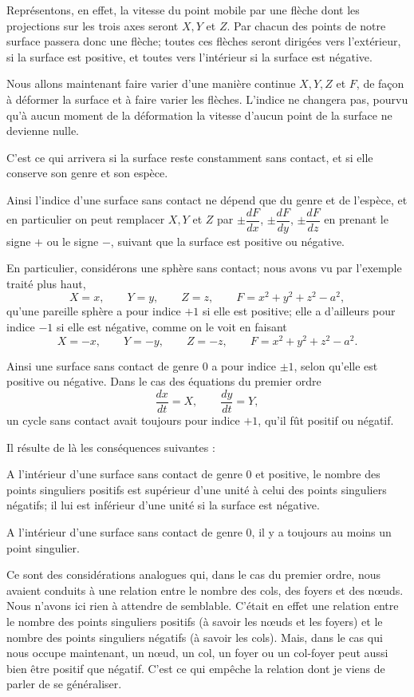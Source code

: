 \documentclass[11pt]{article}
\begin{document}
Représentons, en effet, la vitesse du point mobile par une flèche dont les projections sur les trois axes seront $X,Y$ et $Z$. Par chacun des points de notre surface passera donc une flèche; toutes ces flèches seront dirigées vers l’extérieur, si la surface est positive, et toutes vers l’intérieur si la surface est négative.

Nous allons maintenant faire varier d’une manière continue $X,Y,Z$ et $F$, de façon à déformer la surface et à faire varier les flèches. L’indice ne changera pas, pourvu qu’à aucun moment de la déformation la vitesse d’aucun point de la surface ne devienne nulle.

C’est ce qui arrivera si la surface reste constamment sans contact, et si elle conserve son genre et son espèce.

Ainsi l’indice d’une surface sans contact ne dépend que du genre et de l’espèce, et en particulier on peut remplacer $X,Y$ et $Z$ par $\pm\dfrac{dF}{dx}$, $\pm\dfrac{dF}{dy}$, $\pm\dfrac{dF}{dz}$ en prenant le signe $+$ ou le signe $-$, suivant que la surface est positive ou négative.

En particulier, considérons une sphère sans contact; nous avons vu par l’exemple traité plus haut,
\[
X=x,\qquad Y=y,\qquad Z=z,
\qquad F=x^2+y^2+z^2-a^2,
\]
qu’une pareille sphère a pour indice $+1$ si elle est positive; elle a d’ailleurs pour indice $-1$ si elle est négative, comme on le voit en faisant
\[
X=-x,
\qquad Y=-y,
\qquad Z=-z,
\qquad F=x^2+y^2+z^2-a^2.
\]

Ainsi une surface sans contact de genre 0 a pour indice $\pm1$, selon qu’elle est positive ou négative. Dans le cas des équations du premier ordre
\[
\frac{dx}{dt}=X,
\qquad \frac{dy}{dt}=Y,
\]
un cycle sans contact avait toujours pour indice $+1$, qu’il fût positif ou négatif.

Il résulte de là les conséquences suivantes :

A l’intérieur d’une surface sans contact de genre 0 et positive, le nombre des points singuliers positifs est supérieur d’une unité à celui des points singuliers négatifs; il lui est inférieur d’une unité si la surface est négative.

A l’intérieur d’une surface sans contact de genre 0, il y a toujours au moins un point singulier.

Ce sont des considérations analogues qui, dans le cas du premier ordre, nous avaient conduits à une relation entre le nombre des cols, des foyers et des nœuds. Nous n’avons ici rien à attendre de semblable. C’était en effet une relation entre le nombre des points singuliers positifs (à savoir les nœuds et les foyers) et le nombre des points singuliers négatifs (à savoir les cols). Mais, dans le cas qui nous occupe maintenant, un nœud, un col, un foyer ou un col-foyer peut aussi bien être positif que négatif. C’est ce qui empêche la relation dont je viens de parler de se généraliser.
\end{document}
